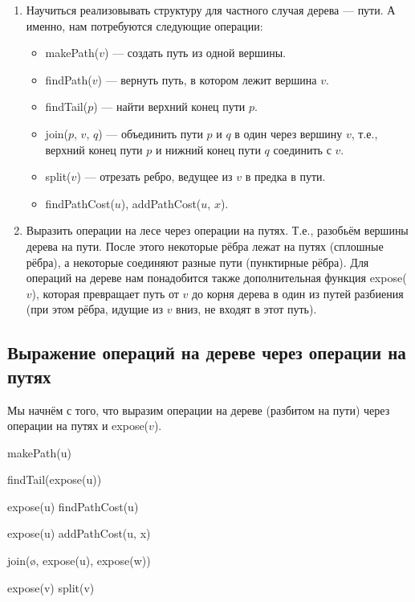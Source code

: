 \begin{enumerate}
	\item Научиться реализовывать структуру для частного случая дерева --- пути. А именно, нам потребуются следующие операции:
		\begin{itemize}
			\item makePath($v$) --- создать путь из одной вершины.
			\item findPath($v$) --- вернуть путь, в котором лежит вершина $v$.
			\item findTail($p$) --- найти верхний конец пути $p$.
			\item join($p$, $v$, $q$) --- объединить пути $p$ и $q$ в один через вершину $v$, т.е., верхний конец пути $p$ и нижний конец пути $q$ соединить с $v$.
			\item split($v$) --- отрезать ребро, ведущее из $v$ в предка в пути.
			\item findPathCost($u$), addPathCost($u$, $x$).
		\end{itemize}
	\item Выразить операции на лесе через операции на путях. Т.е., разобьём вершины дерева на пути. После этого некоторые рёбра лежат на путях (сплошные рёбра), а некоторые соединяют разные пути (пунктирные рёбра). Для операций на дереве нам понадобится также дополнительная функция expose($v$), которая превращает путь от $v$ до корня дерева в один из путей разбиения (при этом рёбра, идущие из $v$ вниз, не входят в этот путь).
\end{enumerate}

\subsection{Выражение операций на дереве через операции на путях}

Мы начнём с того, что выразим операции на дереве (разбитом на пути) через операции на путях и expose($v$).

\begin{algorithmic}[1]
		\State makePath(u)
	\EndProcedure

		\State findTail(expose(u))
	\EndProcedure

		\State expose(u)
		\State findPathCost(u)
	\EndProcedure

		\State expose(u)
		\State addPathCost(u, x)
	\EndProcedure

		\State join(\o, expose(u), expose(w))
	\EndProcedure

		\State expose(v)
		\State split(v)
	\EndProcedure

\end{algorithmic}

